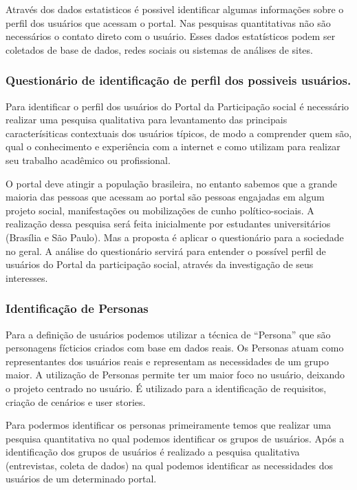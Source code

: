 	Através dos dados estatisticos é possivel identificar algumas informações sobre o perfil dos usuários que acessam o portal. Nas pesquisas quantitativas não são necessários o contato direto com o usuário. Esses dados estatísticos podem ser coletados de base de dados, redes sociais ou sistemas de análises de sites.

\subsubsection{Questionário de identificação de perfil dos possiveis usuários.}

Para identificar o perfil dos usuários do Portal da Participação social é necessário realizar uma pesquisa qualitativa para levantamento das principais caracterísiticas contextuais dos usuários típicos, de modo a comprender quem são, qual o conhecimento e experiência com a internet e como utilizam para realizar seu trabalho acadêmico ou profissional. 

O portal deve atingir a população brasileira, no entanto sabemos que a grande maioria das pessoas que acessam ao portal são pessoas engajadas em algum projeto social, manifestações ou mobilizações de cunho político-sociais. A realização dessa pesquisa será feita inicialmente por estudantes universitários (Brasília e São Paulo). Mas a proposta é aplicar o questionário para a sociedade no geral.
A análise do questionário servirá para entender o possível perfil de usuários do Portal da participação social, através da investigação de seus interesses.


\subsubsection{Identificação de Personas}

Para a definição de usuários podemos utilizar a técnica de “Persona” que são personagens fícticios criados com base em dados reais. Os Personas atuam como representantes dos usuários reais e representam as necessidades de um grupo maior. 
A utilização de Personas permite ter um maior foco no usuário, deixando o projeto centrado no usuário. É utilizado para a identificação de requisitos, criação de cenários e user stories. 

	Para podermos identificar os personas primeiramente temos que realizar uma pesquisa quantitativa no qual podemos identificar os grupos de usuários. Após a identificação dos grupos de usuários é realizado a pesquisa qualitativa (entrevistas, coleta de dados) na qual podemos identificar as necessidades dos usuários de um determinado portal.

